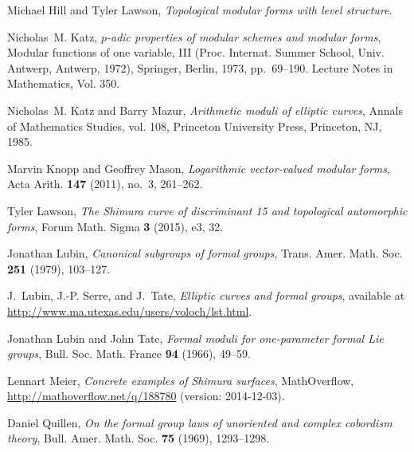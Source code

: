 \documentclass{rs}
\theoremstyle{definition}
\theoremstyle{remark}
\renewcommand{\=}{\approx}
\renewcommand{\-}{\sim}
\numberwithin{equation}{section}
\begin{document}
\begin{thebibliography}
Michael Hill and Tyler Lawson, \emph{Topological modular forms with level
  structure}. 

Nicholas~M. Katz, \emph{{$p$}-adic properties of modular schemes and modular
  forms}, Modular functions of one variable, {III} ({P}roc. {I}nternat.
  {S}ummer {S}chool, {U}niv. {A}ntwerp, {A}ntwerp, 1972), Springer, Berlin,
  1973, pp.~69--190. Lecture Notes in Mathematics, Vol. 350. 

Nicholas~M. Katz and Barry Mazur, \emph{Arithmetic moduli of elliptic curves},
  Annals of Mathematics Studies, vol. 108, Princeton University Press,
  Princeton, NJ, 1985. 

Marvin Knopp and Geoffrey Mason, \emph{Logarithmic vector-valued modular
  forms}, Acta Arith. \textbf{147} (2011), no.~3, 261--262. 

Tyler Lawson, \emph{The {S}himura curve of discriminant 15 and topological
  automorphic forms}, Forum Math. Sigma \textbf{3} (2015), e3, 32.

Jonathan Lubin, \emph{Canonical subgroups of formal groups}, Trans. Amer. Math.
  Soc. \textbf{251} (1979), 103--127. 

J.~Lubin, J.-P. Serre, and J.~Tate, \emph{Elliptic curves and formal groups}, 
  available at \\ \href{http://www.ma.utexas.edu/users/voloch/lst.html}
  {http://www.ma.utexas.edu/users/voloch/lst.html}.

Jonathan Lubin and John Tate, \emph{Formal moduli for one-parameter formal
  {L}ie groups}, Bull. Soc. Math. France \textbf{94} (1966), 49--59.

Lennart Meier,
  \emph{Concrete examples of Shimura surfaces}, MathOverflow, \\
  \href{http://mathoverflow.net/q/188780}{http://mathoverflow.net/q/188780}
 (version: 2014-12-03).

Daniel Quillen, \emph{On the formal group laws of unoriented and complex
  cobordism theory}, Bull. Amer. Math. Soc. \textbf{75} (1969), 1293--1298.


\end{thebibliography}
\end{document}
